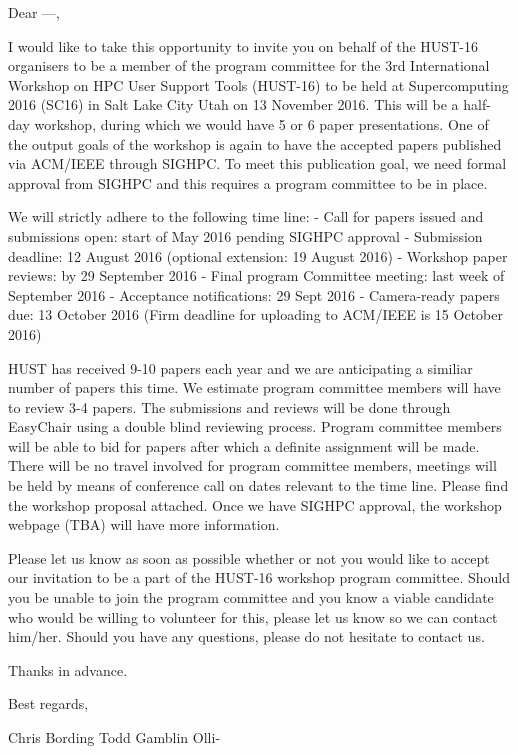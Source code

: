 Dear ---,
  

I would like to take this opportunity to invite you on behalf of the HUST-16
organisers to be a member of the program committee for the 3rd International
Workshop on HPC User Support Tools (HUST-16) to be held at Supercomputing 2016
(SC16) in Salt Lake City Utah on 13 November 2016.  This will be a half-day
workshop, during which we would have 5 or 6 paper presentations.  
One of the output goals of the workshop is again to have the accepted papers
published via ACM/IEEE through SIGHPC.  To meet this publication goal, we need
formal approval from SIGHPC and this requires a program committee to be in
place.

We will strictly adhere to the following time line:
- Call for papers issued and submissions open: start of May 2016 pending SIGHPC
  approval
- Submission deadline: 12 August 2016 (optional extension: 19 August 2016)
- Workshop paper reviews: by 29 September 2016
- Final program Committee meeting: last week of September 2016
- Acceptance notifications: 29 Sept 2016
- Camera-ready papers due: 13 October 2016 (Firm deadline for uploading to
  ACM/IEEE is 15 October 2016)

HUST has received 9-10 papers each year and we are anticipating a similiar number of
papers this time. We estimate program committee members will have to
review 3-4 papers.  The submissions and reviews will be done through 
EasyChair using a double blind reviewing process.  Program committee members
will be able to bid for papers after which a definite assignment will be made.
There will be no travel involved for program committee members, meetings will
be held by means of conference call on dates relevant to the time line.  Please
find the workshop proposal attached. Once we have SIGHPC approval, the workshop
webpage (TBA) will have more information.

Please let us know as soon as possible whether or not you would like to accept
our invitation to be a part of the HUST-16 workshop program committee.  Should
you be unable to join the program committee and you know a viable candidate who
would be willing to volunteer for this, please let us know so we can contact
him/her.  Should you have any questions, please do not hesitate to contact us.

Thanks in advance.

Best regards,

Chris Bording
Todd Gamblin
Olli-
